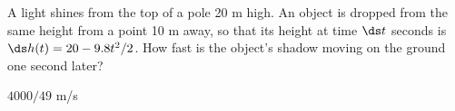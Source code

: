 \begin{enumialphparenastyle}
\begin{ex} 
A light shines from the top of a pole 20 m high.  An object is dropped from
the same height from a point 10 m away, so that its height at time $\ds t$
seconds is $\ds h(t)=20-9.8t^2/2$.  How fast is the object's shadow
moving on the ground one second later?
\begin{sol}
	$4000/49$ m/s
\end{sol}
\end{ex}


%



%


\end{enumialphparenastyle}
